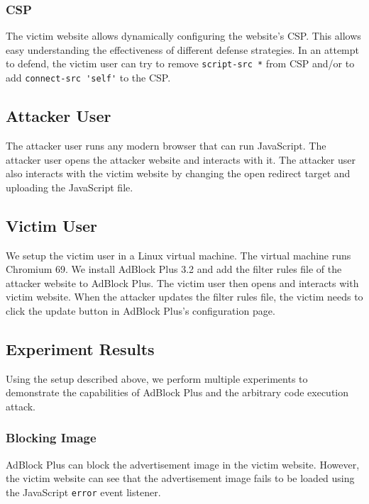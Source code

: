 \documentclass[conference]{IEEEtran}
\begin{document}
\subsubsection{CSP}

The victim website allows dynamically configuring the website's CSP. This allows easy understanding the effectiveness of different defense strategies. In an attempt to defend, the victim user can try to remove \lstinline{script-src *} from CSP and/or to add \lstinline{connect-src 'self'} to the CSP.

\subsection{Attacker User}

The attacker user runs any modern browser that can run JavaScript. The attacker user opens the attacker website and interacts with it. The attacker user also interacts with the victim website by changing the open redirect target and uploading the JavaScript file.

\subsection{Victim User}

We setup the victim user in a Linux virtual machine. The virtual machine runs Chromium 69. We install AdBlock Plus 3.2 and add the filter rules file of the attacker website to AdBlock Plus. The victim user then opens and interacts with victim website. When the attacker updates the filter rules file, the victim needs to click the update button in AdBlock Plus's configuration page.

\subsection{Experiment Results}

Using the setup described above, we perform multiple experiments to demonstrate the capabilities of AdBlock Plus and the arbitrary code execution attack.

\subsubsection{Blocking Image}

AdBlock Plus can block the advertisement image in the victim website. However, the victim website can see that the advertisement image fails to be loaded using the JavaScript \lstinline{error} event listener.
\end{document}
